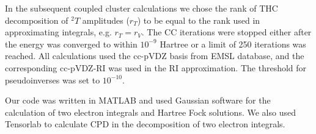 In the subsequent coupled cluster calculations we chose the rank of THC 
decomposition of ${}^2T$ amplitudes ($r_{T}$) to be equal to the rank 
used in approximating integrals, e.g. $r_{T} = r_{V}$. 
The CC iterations were stopped either after the energy was converged to within 
$10^{-9}$ Hartree or a limit of 250 iterations 
was reached. All calculations used the cc-pVDZ basis from EMSL
database,\cite{schuchardt2007basis} and the corresponding cc-pVDZ-RI
was used in the RI approximation. The threshold for pseudoinverses was set to 
$10^{-10}$.

Our code was written in MATLAB and used Gaussian software\cite{gaussian} 
for the calculation of two electron integrals and Hartree Fock solutions. We 
also used Tensorlab\cite{vervliettensorlab} to calculate CPD in the 
decomposition of two electron integrals.

